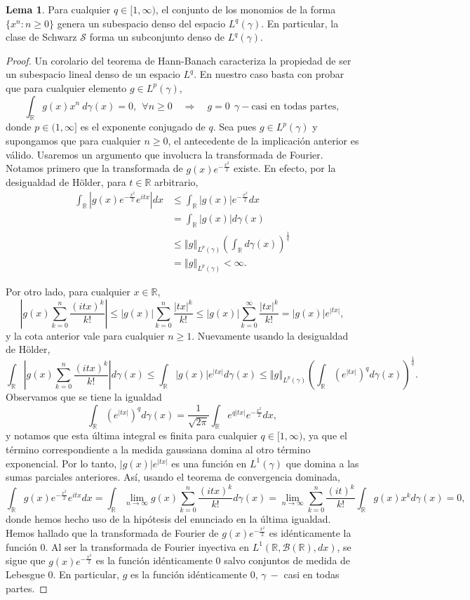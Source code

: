 \documentclass[letterpaper,twoside,12pt]{book}
\newcommand{\R}{\mathbb{R}}
\newcommand{\B}{\mathcal{B}}
\renewcommand{\S}{\mathcal{S}}
\newcommand{\1}{\mathds{1}}
\newcommand{\abs}[1]{\left\lvert #1 \right\rvert}
\renewcommand{\to}{\rightarrow}
\newcommand{\ent}{\Longrightarrow}
\newcommand{\norm}[1]{\left\Vert #1 \right\Vert}
\theoremstyle{definition}
\theoremstyle{definition}
\theoremstyle{remark}
\theoremstyle{definition}
\theoremstyle{definition}
\theoremstyle{definition}
\theoremstyle{definition}
\theoremstyle{definition}
\newtheorem{lema}{Lema}
\begin{document}
\begin{lema} 
Para cualquier $q\in [1,\infty)$, el conjunto de los monomios de la forma $\{x^n: n\geq0\}$ genera un subespacio denso del espacio $L^{q}(\gamma)$. En particular, la clase de Schwarz $\S$ forma un subconjunto denso de $L^q(\gamma)$.
\end{lema}
\begin{proof} 
   Un corolario del teorema de Hann-Banach caracteriza la propiedad de ser un subespacio lineal denso de un espacio $L^{q}$. En nuestro caso basta con probar que para cualquier elemento $g \in L^{p}(\gamma)$, 
   \[
   \int_\R g(x)x^{n} \ d\gamma(x)=0, \ \ \forall n\geq0  \quad \ent \quad g=0 \ \ \gamma- \text{casi en todas partes},
   \]
   donde $p\in (1,\infty]$ es el exponente conjugado de $q$. Sea pues $g\in L^{p}(\gamma)$ y supongamos que para cualquier $n\geq0$, el antecedente de la implicación anterior es válido. Usaremos un argumento que involucra la transformada de Fourier. Notamos primero que la transformada de $g(x)e^{-\frac{x^2}{2}}$ existe. En efecto, por la desigualdad de Hölder, para $t\in \R$ arbitrario,
      \begin{align*}
         \int_{\R}|g(x)e^{-\frac{x^2}{2}}e^{itx}|dx&\leq \int_{\R}|g(x)|e^{-\frac{x^2}{2}}dx\\
         &=\int_{\R}|g(x)|d\gamma(x)\\
         &\leq\norm{g}_{L^{p}(\gamma)}\left(\int_{\R}d\gamma(x)\right)^{\frac{1}{q}}\\
         &=\norm{g}_{L^{p}(\gamma)}<\infty.
      \end{align*}
   
   Por otro lado, para cualquier $x\in \R$,  
   \[
   \abs{g(x)\sum_{k=0}^{n}\frac{(itx)^k}{k!}}\leq |g(x)|\sum_{k=0}^{n}\frac{|tx|^{k}}{k!}\leq |g(x)|\sum_{k=0}^{\infty}\frac{|tx|^{k}}{k!}=|g(x)|e^{|tx|},
   \]
   y la cota anterior vale para cualquier $n\geq1$. Nuevamente usando la desigualdad de Hölder,
   \[
   \int_\R\abs{g(x)\sum_{k=0}^{n}\frac{(itx)^{k}}{k!}}d\gamma(x)\leq \int_\R |g(x)|e^{|tx|}d\gamma(x)\leq \norm{g}_{L^{p}(\gamma)}\left(\int_\R (e^{|tx|})^qd\gamma(x)\right)^{\frac{1}{q}}. 
   \]
   Observamos que se tiene la igualdad 
   \[
   \int_\R (e^{|tx|})^{q}d\gamma(x)=\frac{1}{\sqrt{2\pi}}\int_\R e^{q|tx|}e^{-\frac{x^2}{2}}dx,
   \]
   y notamos que esta última integral es finita para cualquier $q\in [1,\infty)$, ya que el término correspondiente a la medida gaussiana domina al otro término exponencial. Por lo tanto, $|g(x)|e^{|tx|}$ es una función en $L^{1}(\gamma)$ que domina a las sumas parciales anteriores. Así, usando el teorema de convergencia dominada, 
   \[
   \int_\R g(x)e^{-\frac{x^2}{2}}e^{itx}dx=\int_\R \lim_{n\to \infty} g(x)\sum_{k=0}^{n}\frac{(itx)^k}{k!}d\gamma(x)=\lim_{n\to \infty}\sum_{k=0}^{n}\frac{(it)^k}{k!}\int_\R g(x)x^k d\gamma(x)=0, 
   \]
   donde hemos hecho uso de la hipótesis del enunciado en la última igualdad. Hemos hallado que la transformada de Fourier de $g(x)e^{-\frac{x^2}{2}}$ es idénticamente la función 0. Al ser la transformada de Fourier inyectiva en $L^{1}(\R,\B(\R),dx)$, se sigue que $g(x)e^{-\frac{x^2}{2}}$ es la función idénticamente 0 salvo conjuntos de medida de Lebesgue 0. En particular, $g$ es la función idénticamente 0, $\gamma \ -$ casi en todas partes.  


\end{proof}
\end{document}
